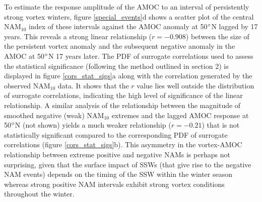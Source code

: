 To estimate the response amplitude of the AMOC to an interval of persistently strong vortex winters, figure \ref{special_events}d shows a scatter plot of the central NAM$_{10}$ index of these intervals against the AMOC anomaly at 50$\degree$N lagged  by 17 years. This reveals a strong linear relationship ($r = -0.908$) between the size of the persistent vortex anomaly and the subsequent negative anomaly in the AMOC at 50$\degree$N 17 years later. The PDF of surrogate correlations used to assess the statistical significance (following the method outlined in section 2) is displayed in figure \ref{cors_stat_sigs}a along with the correlation generated by the observed NAM$_{10}$ data. It shows that the $r$ value lies well outside the distribution of surrogate correlations, indicating the high level of significance of the linear relationship. A similar analysis of the relationship between the magnitude of smoothed negative (weak) NAM$_{10}$ extremes and the lagged AMOC response at 50$\degree$N (not shown) yields a much weaker relationship ($r = -0.21$) that is not statistically significant compared to the corresponding PDF of surrogate correlations (figure \ref{cors_stat_sigs}b). This asymmetry in the vortex-AMOC relationship between extreme positive and negative NAMs  is perhaps not surprising, given that the surface impact of SSWs (that give rise to the negative NAM events) depends on the timing of the SSW within the winter season whereas strong positive NAM intervals exhibit strong vortex conditions throughout the winter. 

